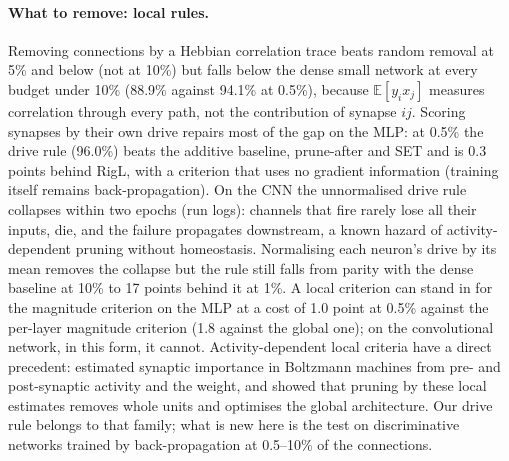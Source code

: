 \documentclass[11pt]{article}
\begin{document}
\paragraph{What to remove: local rules.} Removing connections by a Hebbian correlation trace beats random removal at 5\% and
below (not at 10\%) but falls
below the dense small network at every budget under 10\% (88.9\% against 94.1\% at 0.5\%), because $\mathbb{E}[y_i x_j]$
measures correlation through every path, not the contribution of synapse $ij$. Scoring synapses by their own drive repairs
most of the gap on the MLP: at 0.5\% the drive rule (96.0\%) beats the additive baseline, prune-after and SET and is 0.3
points behind RigL, with a criterion that uses no gradient information (training itself remains back-propagation). On the
CNN the unnormalised drive rule collapses within two epochs (run logs): channels that fire rarely lose all their inputs, die,
and the failure propagates downstream, a known hazard of activity-dependent pruning without homeostasis. Normalising each
neuron's drive by its mean removes the collapse but the rule still falls from parity with the dense baseline at 10\% to 17
points behind it at 1\%. A local criterion can stand in for the magnitude criterion on the MLP at a cost of 1.0 point at
0.5\% against the per-layer magnitude criterion (1.8 against the global one); on the convolutional network, in this form,
it cannot. Activity-dependent local criteria have a direct precedent: \citet{scholl2021} estimated synaptic importance in
Boltzmann machines from pre- and post-synaptic activity and the weight, and showed that pruning by these local estimates
removes whole units and optimises the global architecture. Our drive rule belongs to that family; what is new here is the
test on discriminative networks trained by back-propagation at 0.5--10\% of the connections.
\end{document}
